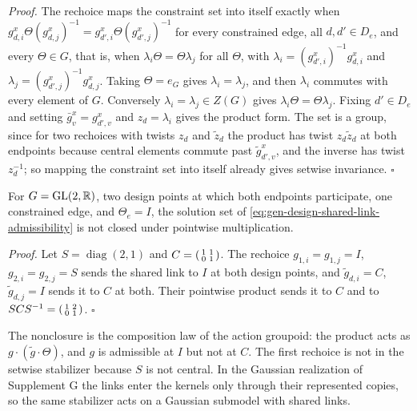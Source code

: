 \noindent\emph{Proof.}
The rechoice maps the constraint set into itself exactly when
\(g_{d,i}^x\Theta(g_{d,j}^x)^{-1}=g_{d',i}^x\Theta(g_{d',j}^x)^{-1}\) for every constrained edge, all
\(d,d'\in D_e\), and every \(\Theta\in G\), that is, when \(\lambda_i\Theta=\Theta\lambda_j\) for all
\(\Theta\), with \(\lambda_i=(g_{d',i}^x)^{-1}g_{d,i}^x\) and
\(\lambda_j=(g_{d',j}^x)^{-1}g_{d,j}^x\). Taking \(\Theta=e_G\) gives \(\lambda_i=\lambda_j\), and
then \(\lambda_i\) commutes with every element of \(G\). Conversely
\(\lambda_i=\lambda_j\in Z(G)\) gives \(\lambda_i\Theta=\Theta\lambda_j\). Fixing \(d'\in D_e\) and
setting \(\bar g_v^x=g_{d',v}^x\) and \(z_d=\lambda_i\) gives the product form. The set is a group,
since for two rechoices with twists \(z_d\) and \(\widetilde z_d\) the product has twist
\(z_d\widetilde z_d\) at both endpoints because central elements commute past
\(\widetilde g_{d',v}^x\), and the inverse has twist \(z_d^{-1}\); so mapping the constraint set into
itself already gives setwise invariance. \hfill$\square$

For \(G=\mathrm{GL}(2,\mathbb R)\), two design points at which both endpoints participate, one constrained edge,
and \(\Theta_e=I\), the solution set of \eqref{eq:gen-design-shared-link-admissibility} is not closed under
pointwise multiplication. 

\noindent\emph{Proof.}
Let \(S=\operatorname{diag}(2,1)\) and \(C=\begin{psmallmatrix}1&1\\0&1\end{psmallmatrix}\). The
rechoice \(g_{1,i}=g_{1,j}=I\), \(g_{2,i}=g_{2,j}=S\) sends the shared link to \(I\) at both design
points, and \(\widetilde g_{d,i}=C\), \(\widetilde g_{d,j}=I\) sends it to \(C\) at both. Their
pointwise product sends it to \(C\) and to \(SCS^{-1}=\begin{psmallmatrix}1&2\\0&1\end{psmallmatrix}\).
\hfill$\square$

The nonclosure is the composition law of the action groupoid: the product acts as
\(g\cdot(\widetilde g\cdot\Theta)\), and \(g\) is admissible at \(I\) but not at \(C\). The first
rechoice is not in the setwise stabilizer because \(S\) is not central. In the Gaussian realization
of Supplement G the links enter the kernels only through their represented copies, so the same
stabilizer acts on a Gaussian submodel with shared links.

